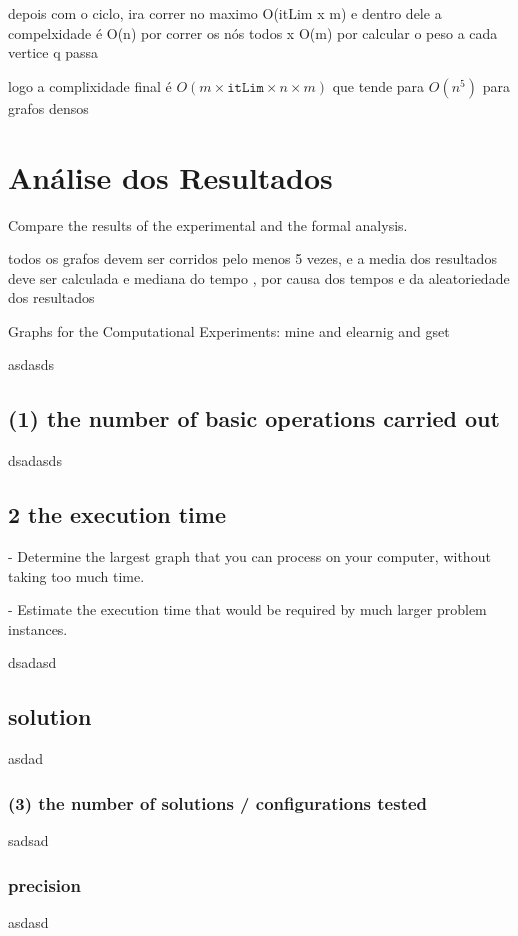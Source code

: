 \documentclass[mirror, portugues]{revdetua}
\begin{document}
depois com o ciclo, ira correr no maximo O(itLim x m) e dentro dele a compelxidade é O(n) por correr os nós todos x O(m) por calcular o peso a cada vertice q passa

logo a complixidade final é $O(m \times \texttt{itLim} \times n \times m)$ que tende para $O(n^5)$ para grafos densos


\section{Análise dos Resultados}

Compare the results of the experimental and the formal analysis.

todos os grafos devem ser corridos pelo menos 5 vezes, e a media dos resultados deve ser calculada e mediana do tempo , por causa dos tempos e da aleatoriedade dos resultados

Graphs for the Computational Experiments: mine and elearnig and gset

asdasds

\subsection{(1) the number of basic operations carried out}

dsadasds

\subsection{2 the execution time }

- Determine the largest graph that you can process on your computer, without taking too much time.

- Estimate the execution time that would be required by much larger problem instances.

dsadasd

\subsection{solution}

asdad

\subsubsection{(3) the number of solutions / configurations tested}

sadsad

\subsubsection{precision}

asdasd




\end{document}

